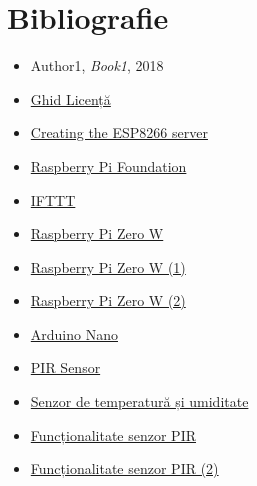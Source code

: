 \chapter*{Bibliografie} 

\begin{itemize}
    \item Author1, \textit{Book1}, 2018
    \item \href{https://profs.info.uaic.ro/~licenta/2019Feb/res/Ghid-LICENTA-2018.pdf}{Ghid Licență}
	\item \href{https://tttapa.github.io/ESP8266/Chap10%20-%20Simple%20Web%20Server.html}{Creating the ESP8266 server}
	\item \href{https://www.raspberrypi.org/}{Raspberry Pi Foundation}
	\item \href{https://www.pcmag.com/reviews/ifttt}{IFTTT}
	\item \href{https://www.pcmag.com/reviews/raspberry-pi-zero-w}{Raspberry Pi Zero W}
	\item \href{https://www.trustedreviews.com/reviews/1-raspberry-pi-zero-w}{Raspberry Pi Zero W (1)}
	\item \href{https://itsfoss.com/raspberry-pi-zero-w/}{Raspberry Pi Zero W (2)}
	\item \href{https://www.makeuseof.com/tag/cheapest-arduino-nano/}{Arduino Nano}
	\item \href{https://www.elektor.com/hc-sr501-pir-motion-sensor-module}{PIR Sensor}
	\item \href{https://www.optimusdigital.ro/ro/senzori-senzori-de-temperatura/1449-modul-senzor-de-temperatura-i-umiditate-dht22.html?search_query=temperatura&results=1060}{Senzor de temperatură și umiditate}
	\item \href{https://lumoscontrols.com/resources/microwave-vs-pir-motion-sensors/}{Funcționalitate senzor PIR}
	\item \href{https://www.tutorialspoint.com/arduino/arduino_pir_sensor.htm}{Funcționalitate senzor PIR (2)}
	
\end{itemize}